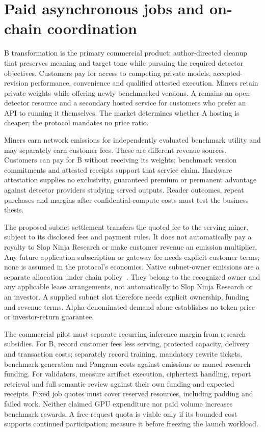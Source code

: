 \section{Paid asynchronous jobs and on-chain
coordination}\label{paid-asynchronous-jobs-and-on-chain-coordination}

B transformation is the primary commercial product: author-directed
cleanup that preserves meaning and target tone while pursuing the
required detector objectives. Customers pay for access to competing
private models, accepted-revision performance, convenience and qualified
attested execution. Miners retain private weights while offering newly
benchmarked versions.
A remains an open detector resource and a secondary hosted service for
customers who prefer an API to running it themselves. The market determines
whether A hosting is cheaper; the protocol mandates no price ratio.

Miners earn network emissions for independently evaluated benchmark
utility and may separately earn customer fees. These are different
revenue sources. Customers can pay for B without receiving its weights;
benchmark version commitments and attested receipts support that service
claim. Hardware attestation supplies no exclusivity, guaranteed premium
or permanent advantage against detector providers studying served outputs.
Reader outcomes, repeat purchases and margins after confidential-compute
costs must test the business thesis.

The proposed subnet settlement transfers the quoted fee to the serving
miner, subject to its disclosed fees and payment rules. It does not
automatically pay a royalty to Slop Ninja Research or make customer
revenue an emission multiplier. Any future application subscription or
gateway fee needs explicit customer terms; none is assumed in the
protocol's economics. Native subnet-owner emissions are a separate
allocation under chain policy~\cite{mechanisms}. They belong to the
recognized owner and any applicable lease arrangements, not automatically
to Slop Ninja Research or an investor. A supplied subnet slot therefore
needs explicit ownership, funding and revenue terms. Alpha-denominated
demand alone establishes no token-price or investor-return guarantee.

The commercial pilot must separate recurring inference margin from
research subsidies. For B, record customer fees less serving, protected
capacity, delivery and transaction costs; separately record training,
mandatory rewrite tickets, benchmark generation and Pangram costs against
emissions or named research funding. For validators, measure artifact
execution, ciphertext handling, report retrieval and full semantic review
against their own funding and expected receipts. Fixed job quotes must
cover reserved resources, including padding and failed work. Neither
claimed GPU expenditure nor paid volume increases benchmark rewards.
A free-request quota is viable only if its bounded cost supports continued
participation; measure it before freezing the launch workload.

